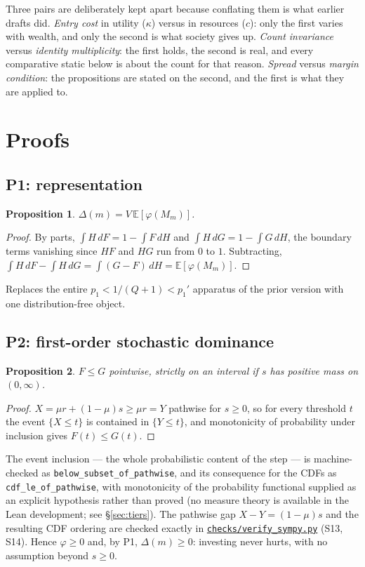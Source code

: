\documentclass[11pt]{article}
\newtheorem{proposition}{Proposition}
\newcommand{\file}[1]{\href{run:#1}{\texttt{#1}}}
\begin{document}
Three pairs are deliberately kept apart because conflating them is what
earlier drafts did. \emph{Entry cost} in utility ($\kappa$) versus in
resources ($c$): only the first varies with wealth, and only the second is
what society gives up. \emph{Count invariance} versus \emph{identity
multiplicity}: the first holds, the second is real, and every comparative
static below is about the count for that reason. \emph{Spread} versus
\emph{margin condition}: the propositions are stated on the second, and the
first is what they are applied to.

\section{Proofs}
\label{sec:proofs}

\subsection{P1: representation}
\label{prop:P1}
\begin{proposition}
$\Delta(m) = V\,\mathbb E[\varphi(M_m)]$.
\end{proposition}
\begin{proof}
By parts, $\int H\,dF = 1-\int F\,dH$ and $\int H\,dG=1-\int G\,dH$, the
boundary terms vanishing since $HF$ and $HG$ run from $0$ to $1$.
Subtracting, $\int H\,dF-\int H\,dG = \int(G-F)\,dH = \mathbb
E[\varphi(M_m)]$.
\end{proof}
Replaces the entire $p_1<1/(Q{+}1)<p_1'$ apparatus of the prior
version with one distribution-free object.

\subsection{P2: first-order stochastic dominance}
\label{prop:P2}
\begin{proposition}
$F\le G$ pointwise, strictly on an interval if $s$ has positive mass
on $(0,\infty)$.
\end{proposition}
\begin{proof}
$X=\mu r+(1-\mu)s\ge \mu r=Y$ pathwise for $s\ge0$, so for every threshold
$t$ the event $\{X\le t\}$ is contained in $\{Y\le t\}$, and monotonicity of
probability under inclusion gives $F(t)\le G(t)$.
\end{proof}

The event inclusion --- the whole probabilistic content of the step --- is
machine-checked as \texttt{below\_subset\_of\_pathwise}, and its consequence
for the CDFs as \texttt{cdf\_le\_of\_pathwise}, with monotonicity of the
probability functional supplied as an explicit hypothesis rather than proved
(no measure theory is available in the Lean development; see
\S\ref{sec:tiers}). The pathwise gap $X-Y=(1-\mu)s$ and the resulting CDF
ordering are checked exactly in \file{checks/verify\_sympy.py} (S13, S14).
Hence $\varphi\ge0$ and, by P1, $\Delta(m)\ge0$: investing never
hurts, with no assumption beyond $s\ge0$.
\end{document}
